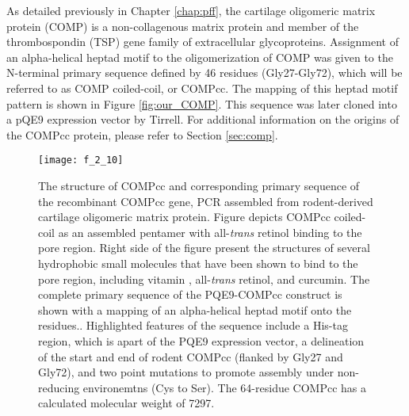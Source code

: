 \begin{refsection}
As detailed previously in Chapter \ref{chap:pff}, the cartilage oligomeric
matrix protein (COMP) is a non-collagenous matrix protein and member of the
thrombospondin (TSP) gene family of extracellular
glycoproteins.\cite{Adams2001,Smith1997,Muller1998,Hedbom1992,Oldberg1992}
Assignment of an alpha-helical heptad motif to the oligomerization of COMP was
given to the N-terminal primary sequence defined by 46 residues (Gly27-Gly72),
which will be referred to as COMP coiled-coil, or COMPcc.\cite{Efimov1994} The
mapping of this heptad motif pattern is shown in Figure \ref{fig:our_COMP}. This
sequence was later cloned into a pQE9 expression vector by
Tirrell.\cite{Shen2006a} For additional information on the origins of the COMPcc
protein, please refer to Section \ref{sec:comp}.
\begin{figure}[h!] \centering \texttt{[image: f\_2\_10]}
    \caption[The structure of COMPcc and corresponding primary
sequence of the recombinant COMPcc gene, PCR assembled from rodent-derived
cartilage oligomeric matrix protein. Figure depicts COMPcc
coiled-coil as an assembled pentamer with all-\emph{trans} retinol binding to
the pore region.  Right side of the figure present the structures of several
hydrophobic small molecules that have been shown to bind to the pore region,
including vitamin , all-\emph{trans} retinol, and
curcumin. The complete primary sequence of the PQE9-COMPcc
construct is shown with a mapping of an alpha-helical heptad motif onto the
residues. Highlighted features of the sequence include a His-tag
region, which is apart of the PQE9 expression vector, a delineation of the start
and end of rodent COMPcc (flanked by Gly27 and Gly72), and two point mutations
to promote assembly under non-reducing environemtns (Cys to Ser).]
    {The structure of COMPcc and corresponding primary
sequence of the recombinant COMPcc gene, PCR assembled from rodent-derived
cartilage oligomeric matrix protein.\cite{Shen2006a} Figure depicts COMPcc
coiled-coil as an assembled pentamer with all-\emph{trans} retinol binding to
the pore region.  Right side of the figure present the structures of several
hydrophobic small molecules that have been shown to bind to the pore region,
including vitamin , all-\emph{trans} retinol, and
curcumin.\cite{Gunasekar2009} The complete primary sequence of the PQE9-COMPcc
construct is shown with a mapping of an alpha-helical heptad motif onto the
residues.\cite{Efimov1994}. Highlighted features of the sequence include a His-tag
region, which is apart of the PQE9 expression vector, a delineation of the start
and end of rodent COMPcc (flanked by Gly27 and Gly72), and two point mutations
to promote assembly under non-reducing environemtns (Cys to Ser). The 64-residue
COMPcc has a calculated molecular weight of \SI{7297}{\Da}.}


\end{figure}
\end{refsection}
